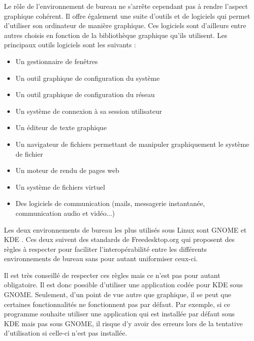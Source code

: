 Le rôle de l'environnement de bureau ne s'arrête cependant pas à rendre l'aspect graphique cohérent. Il offre également une suite d'outils et de logiciels qui permet d'utiliser son ordinateur de manière graphique. Ces logiciels sont d'ailleurs entre autres choisis en fonction de la bibliothèque graphique qu'ils utilisent. Les principaux outils logiciels sont les suivants :
\begin{itemize}
 \item Un gestionnaire de fenêtres
 \item Un outil graphique de configuration du système
 \item Un outil graphique de configuration du réseau
 \item Un système de connexion à sa session utilisateur
 \item Un éditeur de texte graphique
 \item Un navigateur de fichiers permettant de manipuler graphiquement le système de fichier
 \item Un moteur de rendu de pages web
 \item Un système de fichiers virtuel
 \item Des logiciels de communication (mails, messagerie instantanée, communication audio et vidéo...)
\end{itemize}

\vspace{1em}

Les deux environnements de bureau les plus utilisés sous Linux sont GNOME et KDE \cite{FreeDesktop}. Ces deux suivent des standards de Freedesktop.org qui proposent des règles à respecter pour faciliter l’interopérabilité entre les différents environnements de bureau sans pour autant uniformiser ceux-ci.

Il est très conseillé de respecter ces règles mais ce n'est pas pour autant obligatoire. Il est donc possible d'utiliser une application codée pour KDE sous GNOME. Seulement, d'un point de vue autre que graphique, il se peut que certaines fonctionnalités ne fonctionnent pas par défaut. Par exemple, si ce programme souhaite utiliser une application qui est installée par défaut sous KDE mais pas sous GNOME, il risque d'y avoir des erreurs lors de la tentative d'utilisation si celle-ci n'est pas installée.